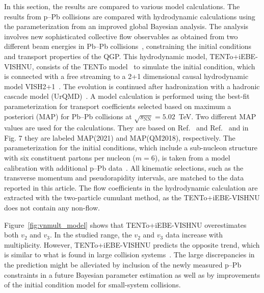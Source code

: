 In this section, the results are compared to various model calculations.
The results from p--Pb collisions are compared with hydrodynamic calculations using the parameterization from an improved global
Bayesian analysis. The analysis involves new sophisticated collective flow observables as obtained from two different beam energies in Pb--Pb collisions~\cite{Parkkila:2021yha}, constraining the initial conditions and transport properties of the QGP. This hydrodynamic model, {TENTo}+iEBE-VISHNU, consists of the {TENTo} model~\cite{Moreland:2014oya} to simulate the initial condition, which is connected with a free streaming to a 2+1 dimensional causal hydrodynamic model VISH2+1~\cite{Shen:2014vra}. The evolution is continued after hadronization with a hadronic cascade model (UrQMD)~\cite{Bass:1998ca,Bleicher:1999xi}.
A model calculation is performed using the best-fit parameterization for transport coefficients selected based on maximum a posteriori (MAP) for Pb--Pb collisions at $\sqrt{s_{\text{NN}}}=5.02$~TeV. Two different MAP values are used for the calculations. They are based on Ref.~\cite{Parkkila:2021yha} and Ref.~\cite{Bernhard:2016tnd} and in Fig. 7 they
are labeled MAP(2021) and MAP(QM2018), respectively.
 The parameterization for the initial conditions, which include a sub-nucleon structure with six constituent partons per nucleon ($m=6$), is taken from a model calibration with additional p--Pb data~\cite{Moreland:2018gsh}. All kinematic selections, such as the transverse momentum and pseudorapidity intervals, are matched to the data reported in this article. The flow coefficients in the hydrodynamic calculation are extracted with the two-particle cumulant method, as the {TENTo}+iEBE-VISHNU does not contain any non-flow.

Figure~\ref{fig:vnmult_model} shows that {TENTo}+iEBE-VISHNU overestimates both $v_2$ and $v_3$. In the studied range, the $v_2$ and $v_3$ data increase with multiplicity. However, {TENTo}+iEBE-VISHNU predicts the opposite trend, which is similar to what is found in large collision systems~\cite{Acharya:2020taj}. The large discrepancies in the prediction might be alleviated by inclusion of the newly measured p--Pb constraints in a future Bayesian parameter estimation as well as by improvements of the initial condition model for small-system collisions.

